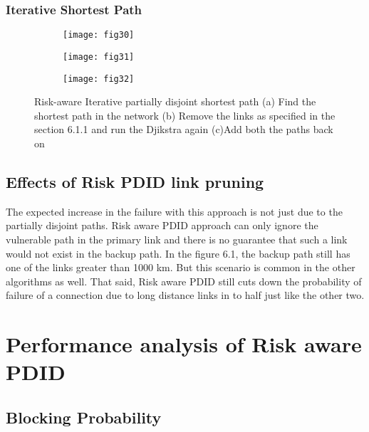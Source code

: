 \subsubsection{Iterative Shortest Path}
\begin{figure*}[hbt!]
\centering
      	\begin{subfigure}{0.32\textwidth}
	\centering
		\texttt{[image: fig30]}
		\caption{}
		\label{fig:ra1}
        \end{subfigure}%
	\hspace{30mm}
	\begin{subfigure}{0.32\textwidth}
        	\centering
		\texttt{[image: fig31]}
		\caption{}
		\label{fig:ra2}
        \end{subfigure}
	\vfill
	\begin{subfigure}{0.32\textwidth}
        	\centering
		\texttt{[image: fig32]}
		\caption{}
		\label{fig:ra3}
        \end{subfigure}
\caption{Risk-aware Iterative partially disjoint shortest path (a) Find the shortest path in the network
(b) Remove the links as specified in the section 6.1.1 and run the Djikstra again (c)Add both the paths back on}
\label{fig:riskAwareAlgo}
\end{figure*}



\subsection {Effects of Risk PDID link pruning} 
The expected increase in the failure with this approach is not just due to the partially disjoint paths. Risk aware PDID approach can only ignore the vulnerable path in the primary link and there is no guarantee that such a link would not exist in the backup path. In the figure 6.1, the backup path still has one of the links greater than 1000 km. But this scenario is common in the other algorithms as well. That said, Risk aware PDID still cuts down the probability of failure of a connection due to long distance links in to half just like the other two. 

\section {Performance analysis of Risk aware PDID}

\subsection {Blocking Probability}


